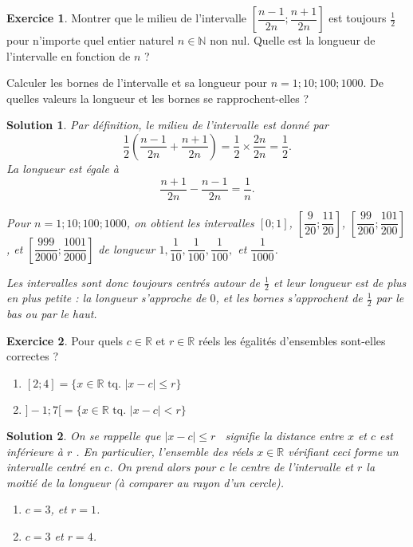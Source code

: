 \documentclass[a4paper, 14pt]{extarticle}
\theoremstyle{plain}
\newtheorem*{sol}{Solution}
\theoremstyle{definition}
\newtheorem{ex}{Exercice}
\newcommand{\R}{\mathbb{R}}
\newcommand{\N}{\mathbb{N}}
\newcommand{\exe}[2]{
		\begin{ex} #1  \end{ex}
		\begin{sol} #2 \end{sol}
	}
\newcommand{\exe}[2]{
		\begin{ex} #1  \end{ex}
	}
\begin{document}
\exe{
	Montrer que le milieu de l'intervalle $\left[\dfrac{n-1}{2n} ; \dfrac{n+1}{2n}\right]$ est toujours $\frac12$ pour n'importe quel entier naturel $n\in\N$ non nul. Quelle est la longueur de l'intervalle en fonction de $n$ ?
	
	Calculer les bornes de l'intervalle et sa longueur pour $n=1; 10; 100; 1000$. De quelles valeurs la longueur et les bornes se rapprochent-elles ?
}{
	Par définition, le milieu de l'intervalle est donné par
		\[ \dfrac12 \left( \dfrac{n-1}{2n} + \dfrac{n+1}{2n} \right)  =\dfrac12 \times \dfrac{2n}{2n} = \dfrac12. \]
	La longueur est égale à
		\[\dfrac{n+1}{2n} -  \dfrac{n-1}{2n} = \dfrac{1}{n}. \]
	
	Pour $n=1; 10; 100; 1000$, on obtient les intervalles $[0;1]$, $\left[\dfrac9{20}; \dfrac{11}{20}\right]$, $\left[\dfrac{99}{200};\dfrac{101}{200}\right]$, et $\left[\dfrac{999}{2000} ; \dfrac{1001}{2000}\right]$ de longueur $1, \dfrac1{10}, \dfrac1{100}, \dfrac1{100},$ et $\dfrac1{1000}$.
	
	Les intervalles sont donc toujours centrés autour de $\frac12$ et leur longueur est de plus en plus petite : la longueur s'approche de $0$, et les bornes s'approchent de $\frac12$ par le bas ou par le haut.

}

%	

\exe{
	Pour quels $c \in\R$ et $r \in \R$ réels les égalités d'ensembles sont-elles correctes ?
	\ifdys
	\else
	\begin{multicols}{2}
	\fi
	\begin{enumerate}
		\item $[2 ; 4] = \{ x \in \R \text{ tq. } |x - c| \leq r \}$
		\item $]{-}1 ; 7[ = \{ x \in \R \text{ tq. } |x - c| < r \}$
	\end{enumerate}
	\ifdys
	\else
	\end{multicols}
	\fi
}{

On se rappelle que \og $|x-c| \leq r$ \fg \ signifie \og la distance entre $x$ et $c$ est inférieure à $r$ \fg. 
En particulier, l'ensemble des réels $x\in\R$ vérifiant ceci forme un intervalle centré en $c$.
On prend alors pour $c$ le centre de l'intervalle et $r$ la moitié de la longueur (à comparer au rayon d'un cercle).
	\ifdys
	\else
	\begin{multicols}{2}
	\fi
	\begin{enumerate}
		\item $c=3$, et $r=1$.
		\item $c = 3$ et $r=4$.
	\end{enumerate}
	\ifdys
	\else
	\end{multicols}
	\fi

}
\end{document}
